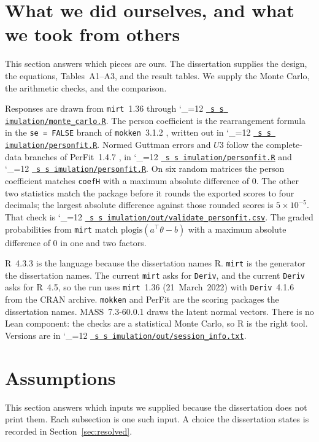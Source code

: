 \documentclass[11pt]{article}
\makeatletter
\newcommand{\proofbase}{https://github.com/alectionary/vibe-math/blob/master/formalization/polytomous-person-fit}
\def\pf@show#1{%
  \ifx\relax#1\else
    #1\allowbreak
    \expandafter\pf@show
  \fi}
\newcommand{\src}{\begingroup\catcode`\_=12 \pf@src}
\newcommand{\pf@src}[1]{%
  \edef\srcurl{\proofbase/#1}%
  \href{\srcurl}{\texttt{\pf@show#1\relax}}\endgroup}
\newcommand{\srcat}{\begingroup\catcode`\_=12 \pf@srcat}
\newcommand{\pf@srcat}[2]{%
  \edef\srcurl{\proofbase/#1\#L#2}%
  \href{\srcurl}{\texttt{\pf@show#1\relax}}\endgroup}
\makeatother
\begin{document}
\section{What we did ourselves, and what we took from others}
\label{sec:ours}

This section answers which pieces are ours.
The dissertation supplies the design, the equations, Tables~A1--A3, and
the result tables.
We supply the Monte Carlo, the arithmetic checks, and the comparison.

Responses are drawn from \texttt{mirt}~1.36 \cite{chalmers2012} through
\srcat{simulation/monte_carlo.R}{108}.
The person coefficient is the rearrangement formula in the
\texttt{se = FALSE} branch of \texttt{mokken}~3.1.2 \cite{vanderark2012},
written out in \srcat{simulation/personfit.R}{12}.
Normed Guttman errors and \(U3\) follow the complete-data branches of
PerFit~1.4.7 \cite{tendeiro2016}, in \srcat{simulation/personfit.R}{70}
and \srcat{simulation/personfit.R}{85}.
On six random matrices the person coefficient matches
\texttt{coefH} with a maximum absolute difference of \(0\).
The other two statistics match the package before it rounds the
exported scores to four decimals; the largest absolute difference
against those rounded scores is \(5\times 10^{-5}\).
That check is \src{simulation/out/validate_personfit.csv}.
The graded probabilities from \texttt{mirt} match
\(\mathrm{plogis}(a^\top\theta-b)\) with a maximum absolute difference
of \(0\) in one and two factors.

R~4.3.3 \cite{rcore} is the language because the dissertation names R.
\texttt{mirt} is the generator the dissertation names.
The current \texttt{mirt} asks for \texttt{Deriv}, and the current
\texttt{Deriv} asks for R~4.5, so the run uses \texttt{mirt}~1.36
(21~March~2022) with \texttt{Deriv}~4.1.6 from the CRAN archive.
\texttt{mokken} and PerFit are the scoring packages the dissertation
names.
MASS~7.3-60.0.1 \cite{venables2002} draws the latent normal vectors.
There is no Lean component: the checks are a statistical Monte Carlo,
so R is the right tool.
Versions are in \src{simulation/out/session_info.txt}.

\section{Assumptions}
\label{sec:assumptions}

This section answers which inputs we supplied because the dissertation
does not print them.
Each subsection is one such input.
A choice the dissertation states is recorded in
Section~\ref{sec:resolved}.
\end{document}
